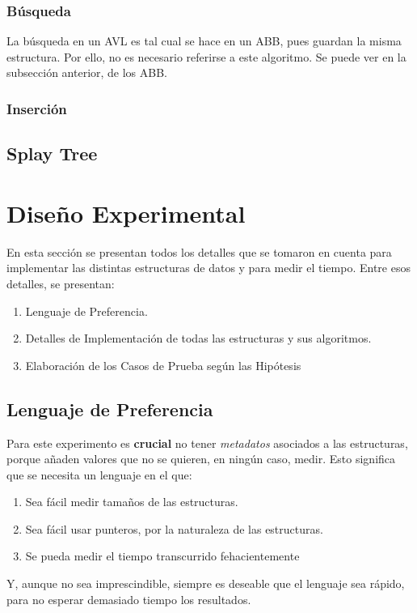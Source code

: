 \documentclass[12pt,letterpaper]{report}
\begin{document}
\subsubsection{Búsqueda}
La búsqueda en un AVL es tal cual se hace en un ABB, pues guardan la misma estructura. Por ello, no es necesario referirse a este algoritmo. Se puede ver en la subsección anterior, de los ABB.

\subsubsection{Inserción}


\subsection{Splay Tree}


\newpage
\section{Diseño Experimental}
En esta sección se presentan todos los detalles que se tomaron en cuenta para implementar las distintas estructuras de datos y para medir el tiempo. Entre esos detalles, se presentan:
\begin{enumerate}
\item Lenguaje de Preferencia.
\item Detalles de Implementación de todas las estructuras y sus algoritmos.
\item Elaboración de los Casos de Prueba según las Hipótesis
\end{enumerate}

\subsection{Lenguaje de Preferencia}
\label{subsec:lenguaje}
Para este experimento es \textbf{crucial} no tener \emph{metadatos} asociados a las estructuras, porque añaden valores que no se quieren, en ningún caso, medir. Esto significa que se necesita un lenguaje en el que:
\begin{enumerate}
\item Sea fácil medir tamaños de las estructuras.
\item Sea fácil usar punteros, por la naturaleza de las estructuras.
\item Se pueda medir el tiempo transcurrido fehacientemente
\end{enumerate}

Y, aunque no sea imprescindible, siempre es deseable que el lenguaje sea rápido, para no esperar demasiado tiempo los resultados.\\
\end{document}
